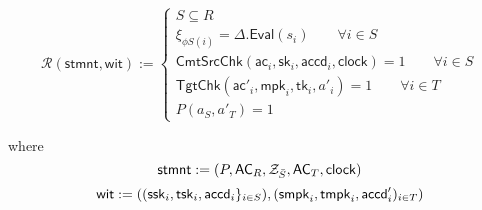 \documentclass{article}      	%
\begin{document}
\begin{equation*}
\mathcal{R}(\mathsf{stmnt}, \mathsf{wit}) := \begin{cases} 
    S \subseteq R \\ 
    \xi_{\phi S(i)} = \Delta.\mathsf{Eval}(s_i) \qquad \forall i \in S \\
    \mathsf{CmtSrcChk}(\mathsf{ac}_i, \mathsf{sk}_i, \mathsf{accd}_i, \mathsf{clock}) = 1 \qquad \forall i \in S \\ 
    \mathsf{TgtChk}(\mathsf{ac'}_i, \mathsf{mpk}_i, \mathsf{tk}_i, a'_i) = 1 \qquad \forall i \in T \\ 
    P(a_S, a'_T) = 1
\end{cases}
\end{equation*}

where 
\begin{equation*}
\mathsf{stmnt} := (P,\mathsf{AC}_R,\mathcal{Z}_{\bar{S}}, \mathsf{AC}_T, \mathsf{clock}) \\
\end{equation*}
\begin{equation*}
\mathsf{wit} := ((\mathsf{ssk}_i,\mathsf{tsk}_i, \mathsf{accd}_i\}_{i\in S}), (\mathsf{smpk}_i, \mathsf{tmpk}_i, \mathsf{accd}'_i)_{i\in T}) \\
\end{equation*}
\end{document}
